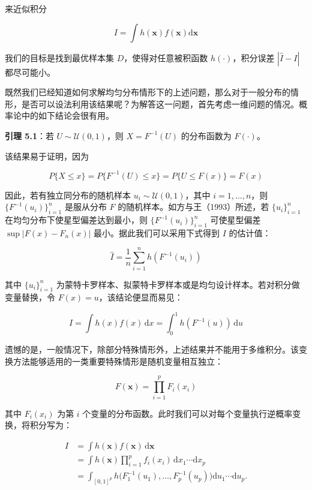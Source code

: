 \documentclass{ctexart}
\begin{document}
来近似积分

\begin{equation*}
I=\int h(\boldsymbol{x})f(\boldsymbol{x})\mathrm{d}\boldsymbol{x}
\end{equation*}

我们的目标是找到最优样本集 $D$，使得对任意被积函数 $h(\cdot)$，积分误差 $|\widehat{I}-I|$都尽可能小。

既然我们已经知道如何求解均匀分布情形下的上述问题，那么对于一般分布的情形，是否可以设法利用该结果呢？为解答这一问题，首先考虑一维问题的情况。概率论中的如下结论会很有用。

\begin{mdquote}
\textbf{引理 5.1}：若 $U\sim\mathcal{U}(0,1)$，则 $X=F^{-1}(U)$ 的分布函数为 $F(\cdot)$。
\end{mdquote}

该结果易于证明，因为

\begin{equation*}
P\{X\le x\}=P\{F^{-1}(U)\le x\}=P\{U\le F(x)\}=F(x)
\end{equation*}

因此，若有独立同分布的随机样本 $u_i\sim\mathcal{U}(0,1)$，其中 $i=1,\dots,n$，则 $\{F^{-1}(u_i)\}_{i=1}^n$ 是服从分布 $F$ 的随机样本。如方与王（1993）所述，若 $\{u_i\}_{i=1}^n$ 在均匀分布下使星型偏差达到最小，则 $\{F^{-1}(u_i)\}_{i=1}^n$ 可使星型偏差 $\sup|F(x)-F_n(x)|$ 最小。据此我们可以采用下式得到 $I$ 的估计值：

\begin{equation*}
\widehat I=\frac1n\sum_{i=1}^nh(F^{-1}(u_i))
\end{equation*}

其中 $\{u_i\}_{i=1}^n$ 为蒙特卡罗样本、拟蒙特卡罗样本或是均匀设计样本。若对积分做变量替换，令 $F(x)=u$，该结论便显而易见：

\begin{equation*}
I=\int h(x)f(x)\,\mathrm{d}x=\int_0^1h(F^{-1}(u))\,\mathrm{d}u
\end{equation*}

遗憾的是，一般情况下，除部分特殊情形外，上述结果并不能用于多维积分。该变换方法能够适用的一类重要特殊情形是随机变量相互独立：

\begin{equation*}
F(\boldsymbol{x})=\prod_{i=1}^{p}F_i(x_i)
\end{equation*}

其中 $F_i(x_i)$ 为第 $i$ 个变量的分布函数。此时我们可以对每个变量执行逆概率变换，将积分写为：

\begin{align*}
I&=\int h(\boldsymbol{x})f(\boldsymbol{x})\,\mathrm{d}\boldsymbol{x}\\
&=\int h(\boldsymbol{x})\prod_{i=1}^{p}f_i(x_i)\,\mathrm{d}x_1\cdots\mathrm{d}x_p\\
&=\int_{[0,1]^p} h\big(F_1^{-1}(u_1),\dots,F_p^{-1}(u_p)\big)\mathrm{d}u_1\cdots\mathrm{d}u_p.
\end{align*}
\end{document}
